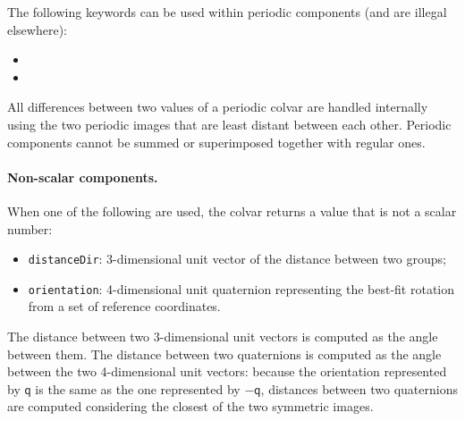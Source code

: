 The following keywords can be used within periodic components (and are
illegal elsewhere):
\begin{itemize}
\item %

\item %
\end{itemize}
All differences between two values of a periodic colvar are handled
internally using the two periodic images that are least distant
between each other.  Periodic components cannot be summed or
superimposed together with regular ones.


\paragraph*{Non-scalar components.}  When one of the following are
used, the colvar returns a value that is not a scalar number:
\begin{itemize}
\item \texttt{distanceDir}: 3-dimensional unit vector of the distance
  between two groups;
\item \texttt{orientation}: 4-dimensional unit quaternion representing
  the best-fit rotation from a set of reference coordinates.
\end{itemize}
The distance between two 3-dimensional unit vectors is computed as the
angle between them.  The distance between two quaternions is computed
as the angle between the two 4-dimensional unit vectors: because the
orientation represented by $\mathsf{q}$ is the same as the one
represented by $-\mathsf{q}$, distances between two quaternions are
computed considering the closest of the two symmetric images.

